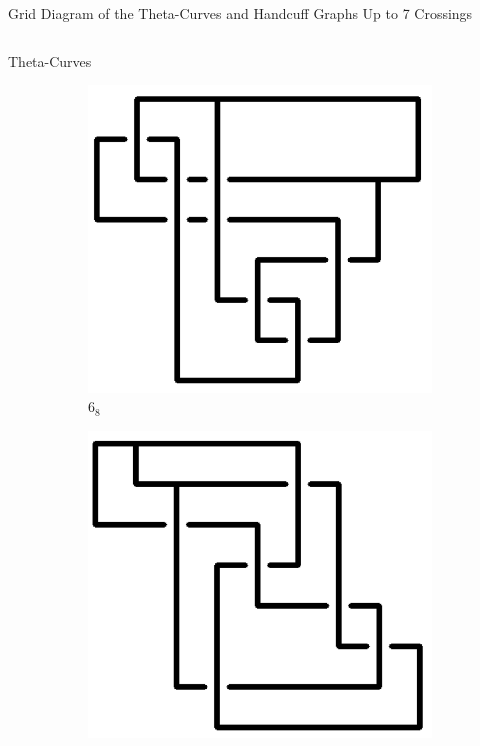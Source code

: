 \documentclass[final]{beamer}
\begin{document}
\begin{frame}[t]
\begin{alertblock}{Grid Diagram of the Theta-Curves and Handcuff Graphs Up to 7 Crossings}
\begin{columns}[t]
\begin{column}{0.5\textwidth}
\begin{alertblock}{Theta-Curves}
\begin{figure}
      \begin{subfigure}{0.075\textwidth}
    \includegraphics[width=\columnwidth]{../Midterm_Poster/grid_diagram/theta_6_8.png}
    \caption{$6_8$} 
    \end{subfigure}
    \begin{subfigure}{0.075\textwidth}
    \includegraphics[width=\columnwidth]{../Midterm_Poster/grid_diagram/theta_6_9.png}

\end{subfigure}
\end{figure}
\end{alertblock}
\end{column}
\end{columns}
\end{alertblock}
\end{frame}
\end{document}
